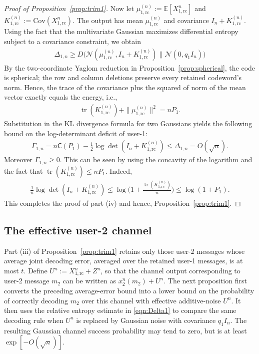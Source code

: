 \documentclass[11pt,onecolumn]{IEEEtran}
\newcommand{\calN}{\mathcal{N}}
\newcommand{\bbE}{\mathbb{E}}
\newcommand{\rvC}{\mathsf{C}}
\DeclareMathOperator{\tr}{tr}
\newcommand{\rc}{\mathrm{rc}}
\begin{document}
\begin{proof}[Proof of Proposition~\ref{prop:trim1}]
Now let $\mu_{1,\rc}^{(n)}:=\bbE[ X_{1,\rc}^n ]$ and $K_{1,\rc}^{(n)}:=\mathrm{Cov}( X_{1,\rc}^n )$. The output has mean $\mu_{1,\rc}^{(n)}$ and covariance $I_n+K_{1,\rc}^{(n)}$. Using the fact that the multivariate Gaussian maximizes differential entropy subject to a covariance constraint, we obtain 
\begin{align}
\Delta_{1,n}\ge D\big(\calN(\mu_{1,\rc}^{(n)},I_n+K_{1,\rc}^{(n)})\|\calN(0,q_1 I_n)\big)
\end{align}
By the two-coordinate Yaglom reduction in Proposition~\ref{prop:spherical}, the code is spherical; the row and column
deletions preserve every retained codeword's norm. Hence, the trace of the covariance plus the  squared of  norm of the mean vector exactly equals the energy, i.e., 
\begin{align}
\tr(K_{1,\rc}^{(n)})+\|\mu_{1,\rc}^{(n)}\|^2=nP_1.
\end{align}
Substitution in the KL divergence formula for two Gaussians yields the following bound on the log-determinant deficit of user-1:
\begin{align}
\Gamma_{1,n}=n\rvC(P_1)-\frac{1}{2}\log\det(I_n+K_{1,\rc}^{(n)})\le\Delta_{1,n}=O(\sqrt{n}). \label{eqn:Gamma1_bd}
\end{align}
Moreover $\Gamma_{1,n}\ge0$. This can be seen by using the concavity of the logarithm and the fact that $\tr(K_{1,\rc}^{(n)})\le nP_1$. Indeed, 
\begin{align}
\frac{1}{n}\log\det(I_n+ K_{1,\rc}^{(n)})\le\log\bigg( 1+\frac{\tr(  K_{1,\rc}^{(n)})}{n} \bigg)\le\log(1+P_1). \label{eqn:nonneg_deficit}
\end{align}
This completes the proof of part (iv) and hence, Proposition~\ref{prop:trim1}.
\end{proof}

\subsection{The effective user-2 channel}\label{sec:user2}
Part (iii) of Proposition~\ref{prop:trim1} retains only those user-2 messages whose average joint decoding error, averaged over the retained user-1 messages, is at most $t$. Define $U^n:=X_{1,\rc}^n+Z^n$, so that the channel output corresponding to user-2 message $m_2$ can be written as $x_2^n(m_2)+U^n$. The next proposition first converts the preceding average-error bound into a lower bound on the probability of correctly decoding $m_2$ over this channel with effective additive-noise $U^n$. It then uses the relative entropy estimate in \eqref{eqn:Delta1} to compare the same decoding rule when $U^n$ is replaced by Gaussian noise with covariance $q_1I_n$. The resulting Gaussian channel success probability may tend to zero, but is at least $\exp[ - O(\sqrt {n })]$.
\end{document}
